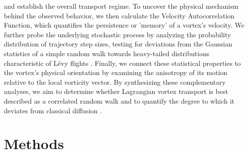 \documentclass[]{article}
\begin{document}
and establish the overall transport regime. To uncover the physical mechanism behind the observed behavior, we then calculate the Velocity Autocorrelation Function, which quantifies the persistence or 'memory' of a vortex's velocity. We further probe the underlying stochastic process by analyzing the probability distribution of trajectory step sizes, testing for deviations from the Gaussian statistics of a simple random walk towards heavy-tailed distributions characteristic of Lévy flights  \citep{kumar2025trappingtransportinertialparticles}. Finally, we connect these statistical properties to the vortex's physical orientation by examining the anisotropy of its motion relative to the local vorticity vector. By synthesizing these complementary analyses, we aim to determine whether Lagrangian vortex transport is best described as a correlated random walk and to quantify the degree to which it deviates from classical diffusion  \citep{kumar2025trappingtransportinertialparticles,aulnette2025transportsphericalmicroparticles3d}.

\section{Methods}
\label{sec:methods}
\end{document}
